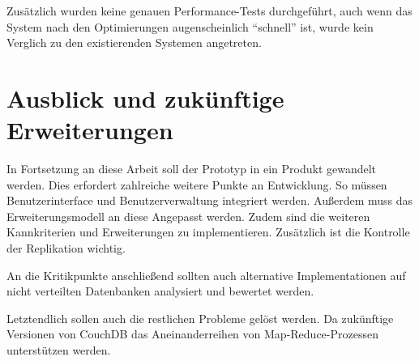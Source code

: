 Zusätzlich wurden keine genauen Performance-Tests durchgeführt,
auch wenn das System nach den Optimierungen augenscheinlich ``schnell'' ist,
wurde kein Verglich zu den existierenden Systemen angetreten.




\section{Ausblick und zukünftige Erweiterungen}
\label{sec:fazit:ausblick}
In Fortsetzung an diese Arbeit soll der Prototyp in ein Produkt gewandelt werden.
Dies erfordert zahlreiche weitere Punkte an Entwicklung.
So müssen Benutzerinterface und Benutzerverwaltung integriert werden.
Außerdem muss das Erweiterungsmodell an diese Angepasst werden.
Zudem sind die weiteren Kannkriterien und Erweiterungen zu implementieren.
Zusätzlich ist die Kontrolle der Replikation wichtig.

An die Kritikpunkte anschließend sollten auch alternative Implementationen auf nicht verteilten Datenbanken analysiert und bewertet werden.

Letztendlich sollen auch die restlichen Probleme gelöst werden.
Da zukünftige Versionen von CouchDB das Aneinanderreihen von Map-Reduce-Prozessen unterstützen werden.